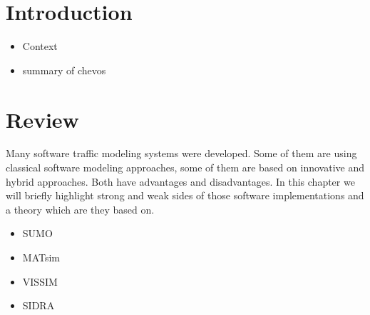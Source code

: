 

\section{Introduction}

\begin{itemize}
	\item Context
	\item summary of chevos
\end{itemize}

\section{Review}

Many software traffic modeling systems were developed.
Some of them are using classical software modeling approaches, some of them are based on innovative and hybrid approaches.
Both have advantages and disadvantages.
In this chapter we will briefly highlight strong and weak sides of those software implementations
and a theory which are they based on.

\begin{itemize}
    \item SUMO
    \item MATsim
    \item VISSIM
    \item SIDRA
\end{itemize}

